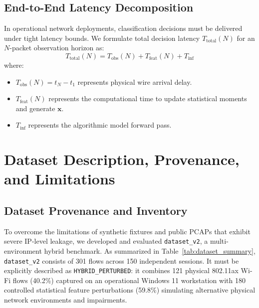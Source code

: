 \documentclass[conference]{IEEEtran}
\begin{document}
\subsection{End-to-End Latency Decomposition}
In operational network deployments, classification decisions must be delivered under tight latency bounds. We formulate total decision latency $T_{\text{total}}(N)$ for an $N$-packet observation horizon as:
\begin{equation}
    T_{\text{total}}(N) = T_{\text{obs}}(N) + T_{\text{feat}}(N) + T_{\text{inf}}
\end{equation}
where:
\begin{itemize}
    \item $T_{\text{obs}}(N) = t_N - t_1$ represents physical wire arrival delay.
    \item $T_{\text{feat}}(N)$ represents the computational time to update statistical moments and generate $\mathbf{x}$.
    \item $T_{\text{inf}}$ represents the algorithmic model forward pass.
\end{itemize}

\section{Dataset Description, Provenance, and Limitations}
\label{sec:dataset}

\subsection{Dataset Provenance and Inventory}
To overcome the limitations of synthetic fixtures and public PCAPs that exhibit severe IP-level leakage, we developed and evaluated \texttt{dataset\_v2}, a multi-environment hybrid benchmark. As summarized in Table~\ref{tab:dataset_summary}, \texttt{dataset\_v2} consists of 301 flows across 150 independent sessions. It must be explicitly described as \texttt{HYBRID\_PERTURBED}: it combines 121 physical 802.11ax Wi-Fi flows (40.2\%) captured on an operational Windows 11 workstation with 180 controlled statistical feature perturbations (59.8\%) simulating alternative physical network environments and impairments.
\end{document}
